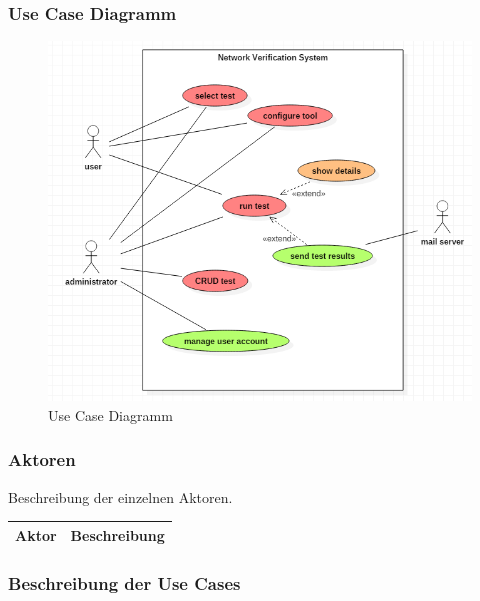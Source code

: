 \subsubsection{Use Case Diagramm}
\begin{minipage}{\textwidth}

\begin{figure}[H]
	\includegraphics[width=\textwidth, height=\textheight, keepaspectratio]{images/UseCaseDiagramm.png}
	\caption{Use Case Diagramm}
\end{figure}

\end{minipage}



\subsubsection{Aktoren}
Beschreibung der einzelnen Aktoren.
\newline
\begin{tabularx}{\textwidth}{| X | X |}
	\hline
	\textbf{Aktor} & \textbf{Beschreibung} \\
	\hline

	\hline

	\hline
	
	\hline
\end{tabularx}


\subsubsection{Beschreibung der Use Cases}



